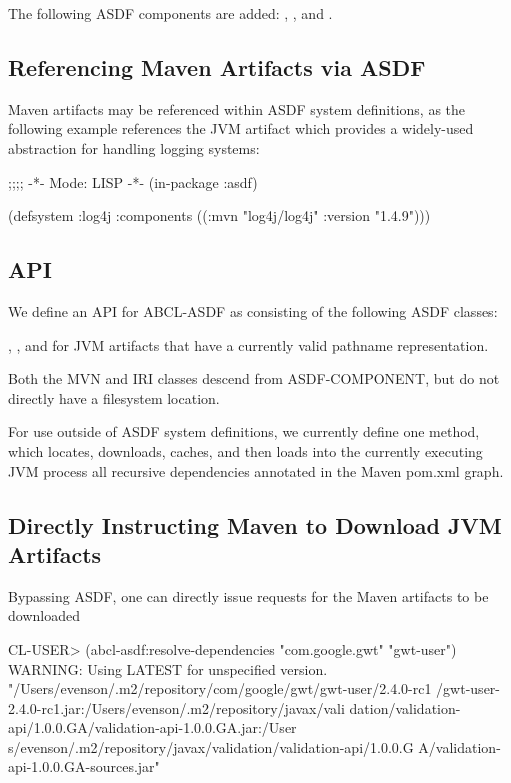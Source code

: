 \documentclass[10pt]{book}
\begin{document}
The following \textsc{ASDF} components are added: ,
,  and .


\subsection{Referencing Maven Artifacts via ASDF}

Maven artifacts may be referenced within \textsc{ASDF} system
definitions, as the following example references the
 JVM artifact which provides a widely-used
abstraction for handling logging systems:

\begin{listing-lisp}
;;;; -*- Mode: LISP -*-
(in-package :asdf)

(defsystem :log4j
  :components ((:mvn "log4j/log4j" :version "1.4.9")))
\end{listing-lisp}

\subsection{API}

We define an API for \textsc{ABCL-ASDF} as consisting of the following
ASDF classes:

, , and
 for JVM artifacts that have a currently
valid pathname representation.

Both the MVN and IRI classes descend from ASDF-COMPONENT, but do not
directly have a filesystem location.

For use outside of ASDF system definitions, we currently define one
method,  which locates,
downloads, caches, and then loads into the currently executing JVM
process all recursive dependencies annotated in the Maven pom.xml
graph.

\subsection{Directly Instructing Maven to Download JVM Artifacts}

Bypassing \textsc{ASDF}, one can directly issue requests for the Maven
artifacts to be downloaded

\begin{listing-lisp}
CL-USER> (abcl-asdf:resolve-dependencies "com.google.gwt"
                                         "gwt-user")
WARNING: Using LATEST for unspecified version.
"/Users/evenson/.m2/repository/com/google/gwt/gwt-user/2.4.0-rc1
/gwt-user-2.4.0-rc1.jar:/Users/evenson/.m2/repository/javax/vali
dation/validation-api/1.0.0.GA/validation-api-1.0.0.GA.jar:/User
s/evenson/.m2/repository/javax/validation/validation-api/1.0.0.G
A/validation-api-1.0.0.GA-sources.jar"
\end{listing-lisp}
\end{document}
